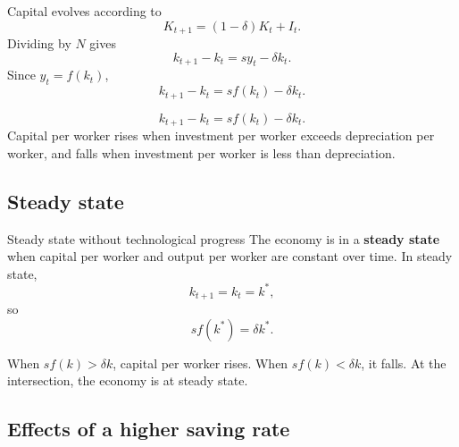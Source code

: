 \documentclass[12pt]{article}
\begin{document}
Capital evolves according to
\[
K_{t+1}=(1-\delta)K_t+I_t.
\]
Dividing by $N$ gives
\[
k_{t+1}-k_t=sy_t-\delta k_t.
\]
Since $y_t=f(k_t)$,
\[
k_{t+1}-k_t=sf(k_t)-\delta k_t.
\]

\begin{keyformula}
\[
k_{t+1}-k_t=sf(k_t)-\delta k_t.
\]
Capital per worker rises when investment per worker exceeds depreciation per worker, and falls when investment per worker is less than depreciation.
\end{keyformula}

\newpage
\subsection{Steady state}

\begin{definition}{Steady state without technological progress}{}
The economy is in a \textbf{steady state} when capital per worker and output per worker are constant over time. In steady state,
\[
k_{t+1}=k_t=k^*,
\]
so
\[
sf(k^*)=\delta k^*.
\]
\end{definition}

\begin{center}
\end{center}

When $sf(k)>\delta k$, capital per worker rises. When $sf(k)<\delta k$, it falls. At the intersection, the economy is at steady state.


\subsection{Effects of a higher saving rate}
\end{document}
